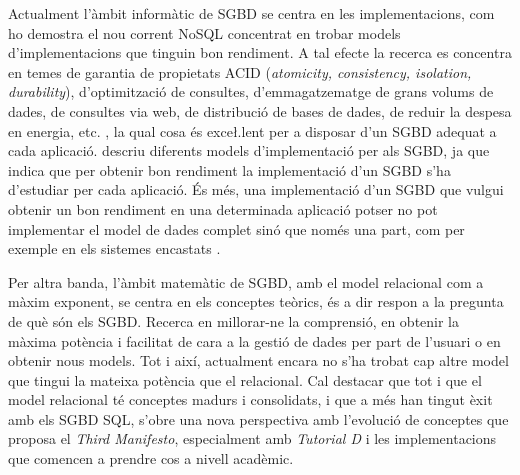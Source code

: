 Actualment l'àmbit informàtic de SGBD se centra en les
implementacions, com ho demostra el nou corrent NoSQL concentrat en
trobar models d'implementacions que tinguin bon rendiment. A tal
efecte la recerca es concentra en temes de garantia de propietats ACID
(\emph{atomicity, consistency, isolation, durability}), d'optimització
de consultes, d'emmagatzematge de grans volums de dades, de consultes
via web, de distribució de bases de dades, de reduir la despesa en
energia, etc. \parencite{stonebraker07,stonebraker10}, la qual cosa és
exce\l.lent per a disposar d'un SGBD adequat a cada aplicació.
\textcite{haerder05:_dbms_archit} descriu diferents models
d'implementació per als SGBD, ja que indica que per obtenir bon
rendiment la implementació d'un SGBD s'ha d'estudiar per cada
aplicació. És més, una implementació d'un SGBD que vulgui obtenir un
bon rendiment en una determinada aplicació potser no pot implementar
el model de dades complet sinó que només una part, com per exemple en
els sistemes
encastats \parencite{saake09:_downs_data_manag_embed_system}.

Per altra banda, l'àmbit matemàtic de SGBD, amb el model relacional
com a màxim exponent, se centra en els conceptes teòrics, és a dir
respon a la pregunta de què són els SGBD. Recerca en millorar-ne la
comprensió, en obtenir la màxima potència i facilitat de cara a la
gestió de dades per part de l'usuari o en obtenir nous models. Tot i
així, actualment encara no s'ha trobat cap altre model que tingui la
mateixa potència que el relacional. Cal destacar que tot i que el
model relacional té conceptes madurs i consolidats, i que a més han
tingut èxit amb els SGBD SQL, s'obre una nova perspectiva amb
l'evolució de conceptes que proposa el \emph{Third Manifesto},
especialment amb \emph{Tutorial D} i les implementacions que comencen a prendre
cos a nivell acadèmic.




















